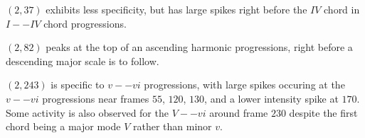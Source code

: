 $(2,37)$ exhibits less specificity, but has large spikes right before the $IV$ chord
in $I--IV$ chord progressions.

$(2,82)$ peaks at the top of an ascending harmonic progressions, right before a descending
major scale is to follow.

$(2, 243)$ is specific to $v -- vi$ progressions, with large spikes occuring at
the $v -- vi$ progressions near frames $55$, $120$, $130$, and a lower intensity spike at
$170$. Some activity is also observed for the $V -- vi$ around frame $230$ despite
the first chord being a major mode $V$ rather than minor $v$.


